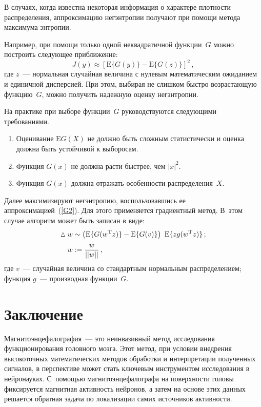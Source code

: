 \begin{multicols}{2}
В случаях, когда известна некоторая информация о характере плот\-ности
распределения, аппроксимацию негэнтропии получают при помощи метода
максимума энтропии.

Например, при помощи только одной неквадратичной функции~$G$
можно построить следующее приближение:
\begin{equation}
\label{G2}
J(y) \approx \left[\mathrm{E}\lbrace G(y)\rbrace - \mathrm{E}\lbrace G(z)\rbrace
\right]^{2}\,,
\end{equation}
где $z$~--- нормальная случайная величина с нулевым математическим
ожиданием и единичной дис\-пер\-си\-ей. При этом, выбирая не слишком
быстро воз\-рас\-та\-ющую функцию~$G$, можно получить надежную оценку
негэнтропии.

На практике при выборе функции~$G$ руководствуются следующими требованиями.
\begin{enumerate}[1.]
\item Оценивание $\mathrm{E}{G(X)}$ не должно быть сложным статистически и
оценка должна быть устойчивой к выборосам.

\item Функция $G(x)$ не должна расти быстрее, чем $|x|^2$.

\item Функция $G(x)$ должна отражать особенности распределения~$X$.
\end{enumerate}

Далее максимизируют негэнтропию, воспользовавшись ее аппроксимацией~(\ref{G2}).
Для этого применяется градиентный метод. В~этом случае
алгоритм может быть записан в виде:
\begin{align*}
\vartriangle w &\sim \left (\mathrm{E}\lbrace G(w^{\mathrm{T}}z)\rbrace -
\mathrm{E}\lbrace G(v)\rbrace \right ) \mathrm{E}\lbrace zg(w^{\mathrm{T}}z)\rbrace\,; \\
w &:= \fr{w}{||w||}\,,
\end{align*}
где $v$~--- случайная величина со стандартным нормальным распределением;
функция  $g$~--- производная функции~$G$.

\section{Заключение}

Магнитоэнцефалография~--- это неинвазивный метод исследования
функционирования головного мозга. Этот метод,  при условии внедрения
высокоточных математических методов обработки и интерпретации
полученных сигналов, в перспективе может стать ключевым инструментом
исследования в нейронауках. С~по\-мощью магнитоэнцефалографа на
поверхности головы фиксируется магнитная активность нейронов, а
затем на основе этих данных решается обратная задача по локализации
самих источников активности.


\end{multicols}
